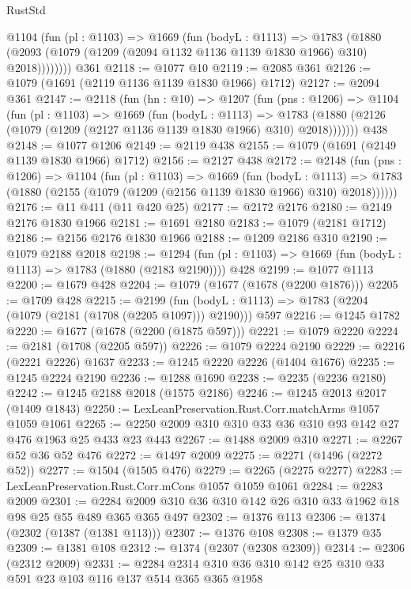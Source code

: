 \begin{lexlean}{RustStd}
\begin{coremodule}
{\begin{coremodule}
{{{{{{{{{{        @1104
          (fun (pl : @1103) =>
          @1669
            (fun (bodyL : @1113) =>
            @1783
              (@1880 (@2093 (@1079 (@1209 (@2094 @1132 @1136 @1139 @1830 @1966) @310) @2018))))))))
    @361
@2118 := @1077 @10
@2119 := @2085 @361
@2126 := @1079 (@1691 (@2119 @1136 @1139 @1830 @1966) @1712)
@2127 := @2094 @361
@2147 := @2118
    (fun (hn : @10) =>
    @1207
      (fun (pns : @1206) =>
      @1104
        (fun (pl : @1103) =>
        @1669
          (fun (bodyL : @1113) =>
          @1783 (@1880 (@2126 (@1079 (@1209 (@2127 @1136 @1139 @1830 @1966) @310) @2018)))))))
    @438
@2148 := @1077 @1206
@2149 := @2119 @438
@2155 := @1079 (@1691 (@2149 @1139 @1830 @1966) @1712)
@2156 := @2127 @438
@2172 := @2148
    (fun (pns : @1206) =>
    @1104
      (fun (pl : @1103) =>
      @1669
        (fun (bodyL : @1113) =>
        @1783 (@1880 (@2155 (@1079 (@1209 (@2156 @1139 @1830 @1966) @310) @2018))))))
@2176 := @11 @411 (@11 @420 @25)
@2177 := @2172 @2176
@2180 := @2149 @2176 @1830 @1966
@2181 := @1691 @2180
@2183 := @1079 (@2181 @1712)
@2186 := @2156 @2176 @1830 @1966
@2188 := @1209 @2186 @310
@2190 := @1079 @2188 @2018
@2198 := @1294 (fun (pl : @1103) => @1669 (fun (bodyL : @1113) => @1783 (@1880 (@2183 @2190)))) @428
@2199 := @1077 @1113
@2200 := @1679 @428
@2204 := @1079 (@1677 (@1678 (@2200 @1876)))
@2205 := @1709 @428
@2215 := @2199
    (fun (bodyL : @1113) => @1783 (@2204 (@1079 (@2181 (@1708 (@2205 @1097))) @2190)))
    @597
@2216 := @1245 @1782
@2220 := @1677 (@1678 (@2200 (@1875 @597)))
@2221 := @1079 @2220
@2224 := @2181 (@1708 (@2205 @597))
@2226 := @1079 @2224 @2190
@2229 := @2216 (@2221 @2226) @1637
@2233 := @1245 @2220 @2226 (@1404 @1676)
@2235 := @1245 @2224 @2190
@2236 := @1288 @1690
@2238 := @2235 (@2236 @2180)
@2242 := @1245 @2188 @2018 (@1575 @2186)
@2246 := @1245 @2013 @2017 (@1409 @1843)
@2250 := LexLeanPreservation.Rust.Corr.matchArms @1057 @1059 @1061
@2265 := @2250 @2009 @310 @310 @33 @36 @310 @93 @142 @27 @476 @1963 @25 @433 @23 @443
@2267 := @1488 @2009 @310
@2271 := @2267 @52 @36 @52 @476
@2272 := @1497 @2009
@2275 := @2271 (@1496 (@2272 @52))
@2277 := @1504 (@1505 @476)
@2279 := @2265 (@2275 @2277)
@2283 := LexLeanPreservation.Rust.Corr.mCons @1057 @1059 @1061
@2284 := @2283 @2009
@2301 := @2284 @2009 @310 @36 @310 @142 @26 @310 @33 @1962 @18 @98 @25 @55 @489 @365 @365 @497
@2302 := @1376 @113
@2306 := @1374 (@2302 (@1387 (@1381 @113)))
@2307 := @1376 @108
@2308 := @1379 @35
@2309 := @1381 @108
@2312 := @1374 (@2307 (@2308 @2309))
@2314 := @2306 (@2312 @2009)
@2331 := @2284 @2314 @310 @36 @310 @142 @25 @310 @33 @591 @23 @103 @116 @137 @514 @365 @365 @1958
}}}}}}}}}}
\end{coremodule}}
\end{coremodule}
\end{lexlean}
